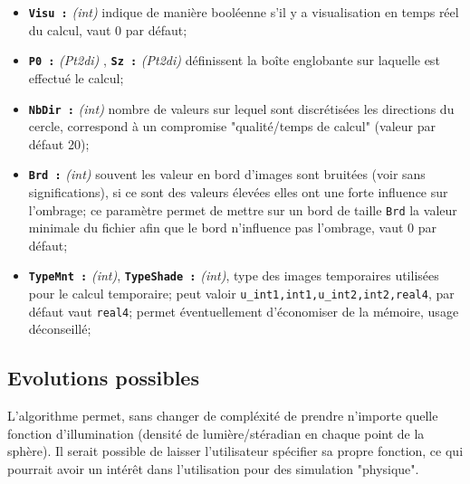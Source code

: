 \begin{itemize}
   \item {\tt \bf Visu :} \emph{(int)}  indique de mani\`ere bool\'eenne 
         s'il y a visualisation en temps r\'eel du calcul,  vaut $0$ 
         par d\'efaut;
         
   \item {\tt \bf P0 :} \emph{(Pt2di)} , {\tt \bf Sz :} \emph{(Pt2di)} 
         d\'efinissent la bo\^ite englobante sur laquelle est effectu\'e
         le calcul;

   \item {\tt \bf NbDir :} \emph{(int)}  nombre de valeurs sur lequel sont
         discr\'etis\'ees  les directions du cercle, correspond \`a un
         compromise "qualit\'e/temps de calcul" (valeur par d\'efaut 20);
         
   \item {\tt \bf Brd :} \emph{(int)} souvent les valeur en bord d'images
         sont bruit\'ees (voir sans significations), si ce sont des valeurs
         \'elev\'ees elles ont une forte influence sur l'ombrage; ce 
         param\`etre permet de mettre sur un bord de taille {\tt Brd}
         la valeur minimale du fichier afin que le bord n'influence
          pas l'ombrage, vaut $0$ par d\'efaut;

   \item {\tt \bf TypeMnt :} \emph{(int)}, {\tt \bf TypeShade :} \emph{(int)},
         type des images temporaires utilis\'ees pour le calcul temporaire;
         peut valoir {\tt u\_int1,int1,u\_int2,int2,real4}, 
         par d\'efaut vaut {\tt real4}; permet \'eventuellement 
         d'\'economiser de la m\'emoire, usage d\'econseill\'e;
\end{itemize}


\subsection{Evolutions possibles}

L'algorithme permet, sans changer de compl\'exit\'e de
prendre n'importe quelle fonction d'illumination (densit\'e
de lumi\`ere/st\'eradian en chaque point de la sph\`ere).
Il serait possible de laisser l'utilisateur sp\'ecifier sa propre
fonction, ce qui pourrait avoir un int\'er\^et dans l'utilisation
pour des simulation "physique".


